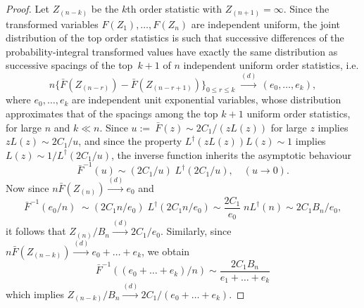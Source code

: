\documentclass[11pt]{article}
\theoremstyle{definition}
\begin{document}
\begin{proof}
	Let $Z_{(n-k)}$ be the $k$th order statistic with $Z_{(n+1)} = \infty$.
	Since the transformed variables $F(Z_1), \ldots, F(Z_n)$ are independent uniform, the joint distribution of the top order statistics is such that successive differences of the probability-integral transformed values have exactly the same distribution as successive spacings of the top~$k+1$ of $n$ independent uniform order statistics, i.e.
	\[
	n \{\bar F(Z_{(n-r)}) - \bar F(Z_{(n-r+1)}) \}_{0\le r \le k}
	\; \stackrel{(d)}{\to} \, (e_0, \ldots, e_k),
	\]
     where $e_0, \ldots, e_k$ are independent unit exponential variables, whose distribution approximates that of the spacings among the top $k+1$ uniform order statistics, for large $n$ and $k\ll n$. Since $u:=~\bar F(z) \sim  2C_1/(z L(z))$ for large $z$ implies $zL(z)\sim 2C_1/u$, and since the property $L^\dagger(z L (z))L(z) \sim 1$ implies $L(z)\sim 1/L^\dagger(2C_1/u)$, the inverse function inherits the asymptotic behaviour
	\[
	\bar{F}^{-1}(u)\sim (2C_1/u)\; L^\dagger(2C_1/u), \quad  (u \rightarrow 0).
	\] 
	Now since $n\bar{F}(Z_{(n)}) \stackrel{(d)}{\to} e_0$ and 
	\[
	\bar F^{-1}(e_0/n) \;\sim (2C_1n/e_0) \;  L^\dagger(2C_1n/e_0)  \sim \frac{2C_1}{e_0} \; n L^\dagger(n) \sim 2C_1 B_n/e_0,
	\]
	it follows that $Z_{(n)}/B_n \stackrel{(d)}{\to}2C_1/e_0$. 
	Similarly, since $n\bar{F}(Z_{(n-k)}) \stackrel{(d)}{\to} e_0+\dots+e_k$, we obtain
	\begin{equation}\label{e_rep}
	\bar{F}^{-1}((e_0+\dots+e_k)/n) \sim \frac{2C_1 B_n}{e_1+\dots+e_k}
	\end{equation}
	which implies $Z_{(n-k)}/B_n \stackrel{(d)}{\to} 2C_1/(e_0+\dots+e_k)$. 
	

\end{proof}
\end{document}

